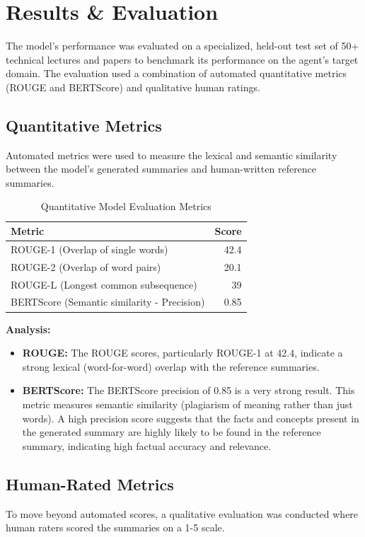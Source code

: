 \documentclass[12pt,a4paper]{article}
\begin{document}
\section{Results \& Evaluation}

The model's performance was evaluated on a specialized, held-out test set of 50+ technical lectures and papers to benchmark its performance on the agent's target domain. The evaluation used a combination of automated quantitative metrics (ROUGE and BERTScore) and qualitative human ratings.

\subsection{Quantitative Metrics}
Automated metrics were used to measure the lexical and semantic similarity between the model's generated summaries and human-written reference summaries.

\begin{table}[H]
\centering
\caption{Quantitative Model Evaluation Metrics}
\label{tab:quant-metrics}
\begin{tabular}{lr}
\toprule
\textbf{Metric} & \textbf{Score} \\
\midrule
ROUGE-1 (Overlap of single words) & 42.4 \\
ROUGE-2 (Overlap of word pairs) & 20.1 \\
ROUGE-L (Longest common subsequence) & 39 \\
BERTScore (Semantic similarity - Precision) & 0.85 \\
\bottomrule
\end{tabular}
\end{table}

\textbf{Analysis:}
\begin{itemize}
    \item \textbf{ROUGE:} The ROUGE scores, particularly ROUGE-1 at 42.4, indicate a strong lexical (word-for-word) overlap with the reference summaries.
    \item \textbf{BERTScore:} The BERTScore precision of 0.85 is a very strong result. This metric measures semantic similarity (plagiarism of meaning rather than just words). A high precision score suggests that the facts and concepts present in the generated summary are highly likely to be found in the reference summary, indicating high factual accuracy and relevance.
\end{itemize}

\subsection{Human-Rated Metrics}
To move beyond automated scores, a qualitative evaluation was conducted where human raters scored the summaries on a 1-5 scale.
\end{document}
